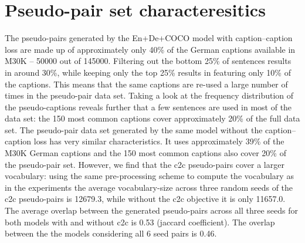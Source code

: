 \section{Pseudo-pair set characteresitics}
The pseudo-pairs generated by the En+De+COCO model with caption--caption loss are made up of
approximately only 40\% of the German captions available in M30K -- 50000 out of 145000. 
Filtering out the bottom 25\% of sentences results in around 30\%, 
while keeping only the top 25\% results in featuring only 10\% of the 
captions. This means that the same captions are re-used a large number of 
times in the pseudo-pair data set. Taking a look at the frequency distribution of 
the pseudo-captions reveals further that a few sentences are used in most of the data set: 
the 150 most common captions cover approximately 20\%  of the full data set.
The pseudo-pair data set generated by the same model without the caption--caption loss
has very similar characteristics. It uses approximately 39\% of the M30K German captions
and the 150 most common captions also cover 20\% of the pseudo-pair set. However, we find
that the c2c pseudo-pairs cover a larger vocabulary: using the same pre-processing scheme
to compute the vocabulary as in the experiments the average vocabulary-size 
across three random seeds of the 
c2c pseudo-pairs is 12679.3, while without the c2c objective it is only 11657.0. 
The average overlap between the generated pseudo-pairs across all three seeds
for both models with and without c2c is 0.53 (jaccard coefficient). The overlap 
between the the models considering all 6 seed pairs is 0.46.



